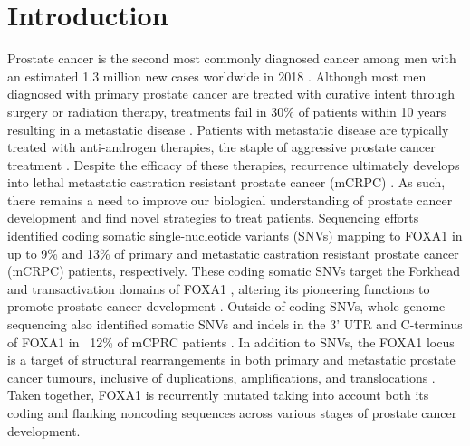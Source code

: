\section{Introduction}

Prostate cancer is the second most commonly diagnosed cancer among men with an estimated 1.3 million new cases worldwide in 2018 \cite{brayGlobalCancerStatistics2018}.
Although most men diagnosed with primary prostate cancer are treated with curative intent through surgery or radiation therapy, treatments fail in 30\% of patients within 10 years \cite{boorjianLongTermOutcomeRadical2007} resulting in a metastatic disease \cite{litwinDiagnosisTreatmentProstate2017}.
Patients with metastatic disease are typically treated with anti-androgen therapies, the staple of aggressive prostate cancer treatment \cite{attardProstateCancer2016}.
Despite the efficacy of these therapies, recurrence ultimately develops into lethal metastatic castration resistant prostate cancer (mCRPC) \cite{attardProstateCancer2016}.
As such, there remains a need to improve our biological understanding of prostate cancer development and find novel strategies to treat patients.
Sequencing efforts identified coding somatic single-nucleotide variants (SNVs) mapping to FOXA1 in up to 9\% \cite{abeshouseMolecularTaxonomyPrimary2015,fraserGenomicHallmarksLocalized2017,barbieriExomeSequencingIdentifies2012, grassoMutationalLandscapeLethal2012,paroliaDistinctStructuralClasses2019,adamsFOXA1MutationsAlter2019} and 13\% \cite{paroliaDistinctStructuralClasses2019,adamsFOXA1MutationsAlter2019,robinsonIntegrativeClinicalGenomics2015} of primary and metastatic castration resistant prostate cancer (mCRPC) patients, respectively.
These coding somatic SNVs target the Forkhead and transactivation domains of FOXA1 \cite{robinsonFOXA1MutationsHormonedependent2013}, altering its pioneering functions to promote prostate cancer development \cite{adamsFOXA1MutationsAlter2019,gaoForkheadDomainMutations2019}.
Outside of coding SNVs, whole genome sequencing also identified somatic SNVs and indels in the 3' UTR and C-terminus of FOXA1 in ~12\% of mCPRC patients \cite{annalaFrequentMutationFOXA12018}.
In addition to SNVs, the FOXA1 locus is a target of structural rearrangements in both primary and metastatic prostate cancer tumours, inclusive of duplications, amplifications, and translocations \cite{paroliaDistinctStructuralClasses2019,adamsFOXA1MutationsAlter2019}.
Taken together, FOXA1 is recurrently mutated taking into account both its coding and flanking noncoding sequences across various stages of prostate cancer development.

